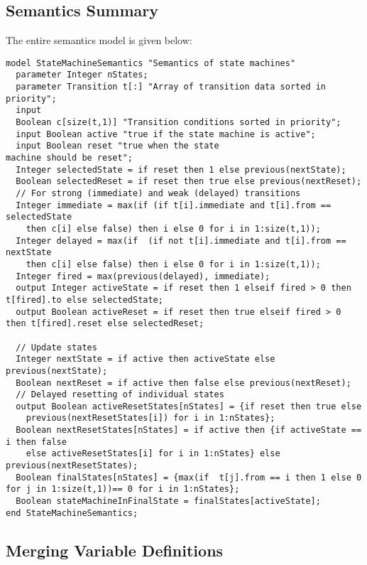\subsection{Semantics Summary}

The entire semantics model is given below:

\begin{lstlisting}[language=modelica]
model StateMachineSemantics "Semantics of state machines"
  parameter Integer nStates;
  parameter Transition t[:] "Array of transition data sorted in priority";
  input
  Boolean c[size(t,1)] "Transition conditions sorted in priority";
  input Boolean active "true if the state machine is active";
  input Boolean reset "true when the state
machine should be reset";
  Integer selectedState = if reset then 1 else previous(nextState);
  Boolean selectedReset = if reset then true else previous(nextReset);
  // For strong (immediate) and weak (delayed) transitions
  Integer immediate = max(if (if t[i].immediate and t[i].from == selectedState
    then c[i] else false) then i else 0 for i in 1:size(t,1));
  Integer delayed = max(if  (if not t[i].immediate and t[i].from == nextState
    then c[i] else false) then i else 0 for i in 1:size(t,1));
  Integer fired = max(previous(delayed), immediate);
  output Integer activeState = if reset then 1 elseif fired > 0 then t[fired].to else selectedState;
  output Boolean activeReset = if reset then true elseif fired > 0 then t[fired].reset else selectedReset;

  // Update states
  Integer nextState = if active then activeState else previous(nextState);
  Boolean nextReset = if active then false else previous(nextReset);
  // Delayed resetting of individual states
  output Boolean activeResetStates[nStates] = {if reset then true else
    previous(nextResetStates[i]) for i in 1:nStates};
  Boolean nextResetStates[nStates] = if active then {if activeState == i then false
    else activeResetStates[i] for i in 1:nStates} else previous(nextResetStates);
  Boolean finalStates[nStates] = {max(if  t[j].from == i then 1 else 0 for j in 1:size(t,1))== 0 for i in 1:nStates};
  Boolean stateMachineInFinalState = finalStates[activeState];
end StateMachineSemantics;
\end{lstlisting}
\subsection{Merging Variable Definitions}

